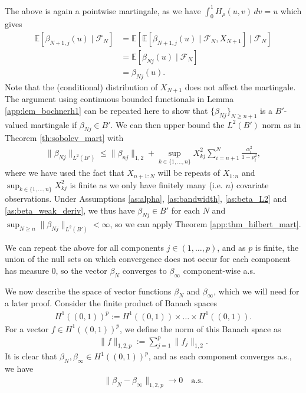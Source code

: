 \documentclass[11pt,a4paper]{article}
\newcommand{\E}{\mathbb{E}}
\begin{document}
\begin{appendices}
The above is again a pointwise martingale, as we have $\int_0^1 H_\rho(u,v)\, dv = u$ which gives
\begin{align*}
    \E\left[\beta_{N+1,j}(u) \mid \mathcal{F}_{N}\right]&=\E\left[\E\left[\beta_{N+1,j}(u)\mid \mathcal{F}_N, X_{N+1}\right] \mid \mathcal{F}_{N}\right]\\
    &=\E\left[\beta_{Nj}(u)\mid \mathcal{F}_{N}\right]\\
    &= \beta_{Nj}(u).
\end{align*}
Note that the (conditional) distribution of $X_{N+1}$ does not affect the martingale. The argument using continuous bounded functionals in {Lemma \ref{app:lem_bochnerh1}} can be repeated here to show that
$\{\beta_{Nj}\}_{N \geq n+1}$ is a $B'$-valued martingale if $\beta_{Nj} \in B'$. We can then upper bound the $L^2(B')$ norm as in {Theorem \ref{th:sobolev_mart}} with
\begin{align*}
    \|\beta_{Nj}\|_{L^2(B')} \leq  \|\beta_{nj}\|_{1,2} + \sup_{k \in \{1,\ldots,n\}} X_{kj}^2\sum_{i = n+1}^N \frac{\alpha_i^2}{1-\rho_i^2},
\end{align*}
where we have used the fact that $X_{n+1:N}$ will be repeats of $X_{1:n}$ and
$\sup_{k \in \{1,\ldots,n\}} X_{kj}^2$ is finite as we only have finitely many (i.e. $n$) covariate observations.
Under {Assumptions \ref{as:alpha}}, {\ref{as:bandwidth}}, {\ref{as:beta_L2}} and {\ref{as:beta_weak_deriv}}, we thus have $\beta_{Nj} \in B'$ for each $N$ and $\sup_{N \geq n} \|\beta_{Nj}\|_{L^2(B')} < \infty$, so we can apply {Theorem \ref{app:thm_hilbert_mart}}. 


We can repeat the above for all components $j \in (1,\ldots,p)$, and as $p$ is finite, the union of the null sets on which convergence does not occur for each component has measure 0, so the vector $\beta_N$ converges to $\beta_\infty$ component-wise a.s. 

We now describe the space of vector functions $\beta_N$ and $\beta_\infty$, which we will need for a later proof. Consider the finite product of Banach spaces 
\begin{align*}
    H^1((0,1))^p := H^1((0,1)) \times \ldots \times H^1((0,1)).
\end{align*}
For a vector $f \in H^1((0,1))^p$, we define the norm of this Banach space as 
\begin{align*}
    \|f\|_{1,2,p} := \sum_{j = 1}^p \|f_j\|_{1,2}.
\end{align*}
It is clear that $\beta_N, \beta_\infty \in H^1((0,1))^p$, and as each component converges a.s., we have
\begin{align*}
    \|\beta_N - \beta_\infty\|_{1,2,p} \to 0 \quad \text{a.s.}
\end{align*}


\end{appendices}
\end{document}
